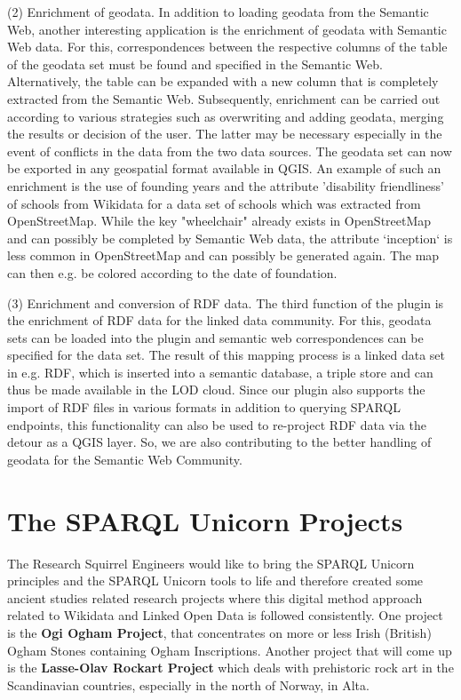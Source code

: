 \documentclass[twocolumn]{autart}
\begin{document}
(2) Enrichment of geodata. In addition to loading geodata from the Semantic Web, another interesting application is the enrichment of geodata with Semantic Web data. For this, correspondences between the respective columns of the table of the geodata set must be found and specified in the Semantic Web. Alternatively, the table can be expanded with a new column that is completely extracted from the Semantic Web. Subsequently, enrichment can be carried out according to various strategies such as overwriting and adding geodata, merging the results or decision of the user. The latter may be necessary especially in the event of conflicts in the data from the two data sources. The geodata set can now be exported in any geospatial format available in QGIS. An example of such an enrichment is the use of founding years and the attribute 'disability friendliness' of schools from Wikidata for a data set of schools which was extracted from OpenStreetMap. While the key "wheelchair" already exists in OpenStreetMap and can possibly be completed by Semantic Web data, the attribute `inception` is less common in OpenStreetMap and can possibly be generated again. The map can then e.g. be colored according to the date of foundation.

(3) Enrichment and conversion of RDF data. The third function of the plugin is the enrichment of RDF data for the linked data community. For this, geodata sets can be loaded into the plugin and semantic web correspondences can be specified for the data set. The result of this mapping process is a linked data set in e.g. RDF, which is inserted into a semantic database, a triple store and can thus be made available in the LOD cloud. Since our plugin also supports the import of RDF files in various formats in addition to querying SPARQL endpoints, this functionality can also be used to re-project RDF data via the detour as a QGIS layer. So, we are also contributing to the better handling of geodata for the Semantic Web Community.

\section{The SPARQL Unicorn Projects}

The Research Squirrel Engineers would like to bring the SPARQL Unicorn principles and the SPARQL Unicorn tools to life and therefore created some ancient studies related research projects where this digital method approach related to Wikidata and Linked Open Data is followed consistently. One project is the \textbf{Ogi Ogham Project}, that concentrates on more or less Irish (British) Ogham Stones containing Ogham Inscriptions. Another project that will come up is the \textbf{Lasse-Olav Rockart Project} which deals with prehistoric rock art in the Scandinavian countries, especially in the north of Norway, in Alta.
\end{document}
